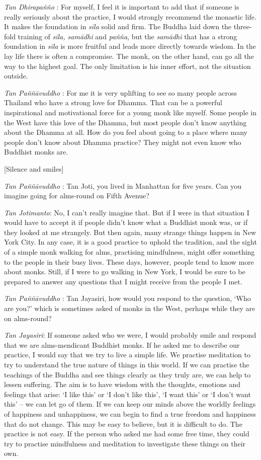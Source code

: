 \emph{Tan Dhirapañño} : For myself, I feel it is important to add that
if someone is really seriously about the practice, I would strongly
recommend the monastic life. It makes the foundation in \emph{sīla}
solid and firm. The Buddha laid down the three-fold training of
\emph{sīla, samādhi} and \emph{pañña}, but the \emph{samādhi} that has a
strong foundation in \emph{sīla} is more fruitful and leads more
directly towards wisdom. In the lay life there is often a compromise.
The monk, on the other hand, can go all the way to the highest goal. The
only limitation is his inner effort, not the situation outside.

\emph{Tan Paññāvuddho} : For me it is very uplifting to see so many
people across Thailand who have a strong love for Dhamma. That can be a
powerful inspirational and motivational force for a young monk like
myself. Some people in the West have this love of the Dhamma, but most
people don't know anything about the Dhamma at all. How do you feel
about going to a place where many people don't know about Dhamma
practice? They might not even know who Buddhist monks are.

{[}Silence and smiles{]}

\emph{Tan Paññāvuddho} : Tan Joti, you lived in Manhattan for five
years. Can you imagine going for alms-round on Fifth Avenue?

\emph{Tan Jotimanto}: No, I can't really imagine that. But if I were in
that situation I would have to accept it if people didn't know what a
Buddhist monk was, or if they looked at me strangely. But then again,
many strange things happen in New York City. In any case, it is a good
practice to uphold the tradition, and the sight of a simple monk walking
for alms, practising mindfulness, might offer something to the people in
their busy lives. These days, however, people tend to know more about
monks. Still, if I were to go walking in New York, I would be sure to be
prepared to answer any questions that I might receive from the people I
met.

\emph{Tan Paññāvuddho} : Tan Jayasiri, how would you respond to the
question, `Who are you?' which is sometimes asked of monks in the West,
perhaps while they are on alms-round?

\emph{Tan Jayasiri}: If someone asked who we were, I would probably
smile and respond that we are alms-mendicant Buddhist monks. If he asked
me to describe our practice, I would say that we try to live a simple
life. We practise meditation to try to understand the true nature of
things in this world. If we can practise the teachings of the Buddha and
see things clearly as they truly are, we can help to lessen suffering.
The aim is to have wisdom with the thoughts, emotions and feelings that
arise: `I like this' or `I don't like this', `I want this' or `I don't
want this' -- we can let go of them. If we can keep our minds above the
worldly feelings of happiness and unhappiness, we can begin to find a
true freedom and happiness that do not change. This may be easy to
believe, but it is difficult to do. The practice is not easy. If the
person who asked me had some free time, they could try to practise
mindfulness and meditation to investigate these things on their own.

